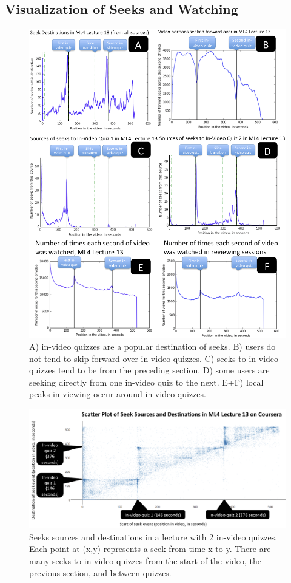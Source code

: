 \documentclass{sigchi}
\begin{document}
\subsection{Visualization of Seeks and Watching}

\begin{figure}
\includegraphics[width=1.0\columnwidth]{lec13-multiplot}
\caption{A) in-video quizzes are a popular destination of seeks. B) users do not tend to skip forward over in-video quizzes. C) seeks to in-video quizzes tend to be from the preceding section. D) some users are seeking directly from one in-video quiz to the next. E+F) local peaks in viewing occur around in-video quizzes.}
\label{fig:lec13-multiplot}
\end{figure}

\begin{figure}
\includegraphics[width=1.0\columnwidth]{scatter-plot-of-seeks}
\caption{Seeks sources and destinations in a lecture with 2 in-video quizzes. Each point at (x,y) represents a seek from time x to y. There are many seeks to in-video quizzes from the start of the video, the previous section, and between quizzes.}
\label{fig:scatter-plot-of-seeks}
\end{figure}
\end{document}
